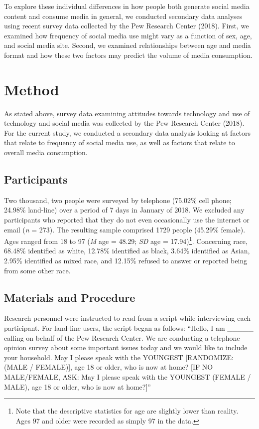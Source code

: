 \documentclass[man, fleqn, noextraspace]{apa6}
\let\rmarkdownfootnote\footnote%
\def\footnote{\protect\rmarkdownfootnote}
\theoremstyle{definition}
\theoremstyle{definition}
\theoremstyle{definition}
\theoremstyle{remark}
\begin{document}
To explore these individual differences in how people both generate
social media content and consume media in general, we conducted
secondary data analyses using recent survey data collected by the Pew
Research Center (2018). First, we examined how frequency of social media
use might vary as a function of sex, age, and social media site. Second,
we examined relationships between age and media format and how these two
factors may predict the volume of media consumption.

\section{Method}\label{method}

As stated above, survey data examining attitudes towards technology and
use of technology and social media was collected by the Pew Research
Center (2018). For the current study, we conducted a secondary data
analysis looking at factors that relate to frequency of social media
use, as well as factors that relate to overall media consumption.

\subsection{Participants}\label{participants}

Two thousand, two people were surveyed by telephone (75.02\% cell phone;
24.98\% land-line) over a period of 7 days in January of 2018. We
excluded any participants who reported that they do not even
occasionally use the internet or email (\emph{n} = 273). The resulting
sample comprised 1729 people (45.29\% female). Ages ranged from 18 to 97
(\emph{M} age = 48.29; \emph{SD} age =
17.94)\footnote{Note that the descriptive statistics for age are slightly lower than reality. Ages 97 and older were recorded as simply 97 in the data.}.
Concerning race, 68.48\% identified as white, 12.78\% identified as
black, 3.64\% identified as Asian, 2.95\% identified as mixed race, and
12.15\% refused to answer or reported being from some other race.

\subsection{Materials and Procedure}\label{materials-and-procedure}

Research personnel were instructed to read from a script while
interviewing each participant. For land-line users, the script began as
follows: \enquote{Hello, I am \_\_\_\_\_ calling on behalf of the Pew
Research Center. We are conducting a telephone opinion survey about some
important issues today and we would like to include your household. May
I please speak with the YOUNGEST {[}RANDOMIZE: (MALE / FEMALE){]}, age
18 or older, who is now at home? {[}IF NO MALE/FEMALE, ASK: May I please
speak with the YOUNGEST (FEMALE / MALE), age 18 or older, who is now at
home?{]}}
\end{document}
